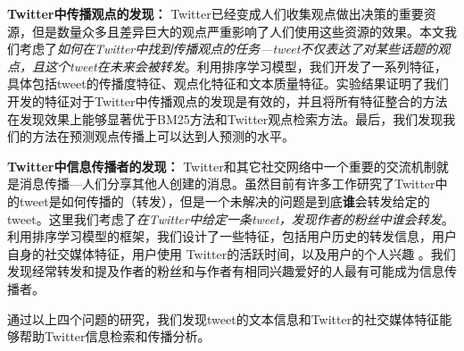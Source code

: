 \begin{cabstract}
\textbf{Twitter中传播观点的发现：} Twitter已经变成人们收集观点做出决策的重要资源，但是数量众多且差异巨大的观点严重影响了人们使用这些资源的效果。本文我们考虑了\emph{如何在Twitter中找到传播观点的任务---tweet不仅表达了对某些话题的观点，且这个tweet在未来会被转发}。利用排序学习模型，我们开发了一系列特征，具体包括tweet的传播度特征、观点化特征和文本质量特征。实验结果证明了我们开发的特征对于Twitter中传播观点的发现是有效的，并且将所有特征整合的方法在发现效果上能够显著优于BM25方法和Twitter观点检索方法。最后，我们发现我们的方法在预测观点传播上可以达到人预测的水平。

\textbf{Twitter中信息传播者的发现：} Twitter和其它社交网络中一个重要的交流机制就是消息传播---人们分享其他人创建的消息。虽然目前有许多工作研究了Twitter中的tweet是如何传播的（转发），但是一个未解决的问题是到底\textbf{谁}会转发给定的tweet。这里我们考虑了\emph{在Twitter中给定一条tweet，发现作者的粉丝中谁会转发}。利用排序学习模型的框架，我们设计了一些特征，包括用户历史的转发信息，用户自身的社交媒体特征，用户使用 Twitter的活跃时间，以及用户的个人兴趣 。我们发现经常转发和提及作者的粉丝和与作者有相同兴趣爱好的人最有可能成为信息传播者。

通过以上四个问题的研究，我们发现tweet的文本信息和Twitter的社交媒体特征能够帮助Twitter信息检索和传播分析。

\end{cabstract}


